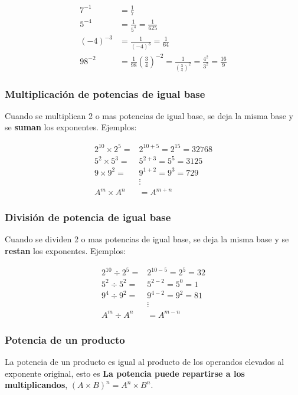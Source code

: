     \begin{align*}
        7^{-1} &= \frac{1}{7} \\
        5^{-4}& = \frac{1}{5^4} = \frac{1}{625} 		\\
        (-4)^{-3} &= \frac{1}{(-4)^3} = \frac{1}{64} \\
        98^{-2} &= \frac{1}{98}
        \left(\frac{3}{4} \right)^{-2} = \frac{1}{\left(\frac{3}{4} \right)^{2}} =\frac{4^2}{3^2} = \frac{16}{9}
    \end{align*}




    \subsubsection*{Multiplicación de potencias de igual base}
    Cuando se multiplican 2 o mas potencias de igual base, se deja la misma base
    y se \textbf{suman} los exponentes. Ejemplos:

    \begin{align*}
        2^{10}\times2^5 =& 2^{10+5} = 2^{15} = 32768\\
        5^2\times5^{3} =& 5^{2+3} = 5^{5} =3125\\
        9 \times 9^2 =& 9^{1+2} = 9^3 = 729 \\
        &\vdots\\
        A^m\times A^n &= A^{m+n}
    \end{align*}

    \subsubsection*{División de potencia de igual base}
    Cuando se dividen 2 o mas potencias de igual base, se deja la misma base y se
    \textbf{restan} los exponentes. Ejemplos:

    \begin{align*}
        2^{10}\div2^5 =& 2^{10-5} = 2^5 = 32\\
        5^2\div5^{2} =& 5^{2-2} = 5^{0} =1\\
        9^4 \div 9^2 =& 9^{4-2} = 9^2 = 81 \\
        &\vdots\\
        A^m\div A^n &= A^{m-n}
    \end{align*}


    \subsubsection*{Potencia de un producto}
    La potencia de un producto es igual al producto de los operandos elevados al
    exponente original, esto es
    \textbf{La potencia puede repartirse a los multiplicandos},
    $(A\times B)^{n} = A^n \times B^n $.

